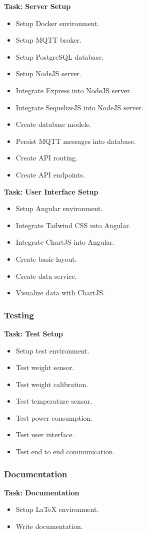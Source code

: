 \textbf{Task: Server Setup}
\begin{itemize}
    \item Setup Docker environment.
    \item Setup MQTT broker.
    \item Setup PostgreSQL database.
    \item Setup NodeJS server.
    \item Integrate Express into NodeJS server.
    \item Integrate SequelizeJS into NodeJS server.
    \item Create database models.
    \item Persist MQTT messages into database.
    \item Create API routing.
    \item Create API endpoints.
\end{itemize}

\newpage
\textbf{Task: User Interface Setup}
\begin{itemize}
    \item Setup Angular environment.
    \item Integrate Tailwind CSS into Angular.
    \item Integrate ChartJS into Angular.
    \item Create basic layout.
    \item Create data service.
    \item Visualize data with ChartJS.
\end{itemize}

\subsubsection{Testing}
\textbf{Task: Test Setup}
\begin{itemize}
    \item Setup test environment.
    \item Test weight sensor.
    \item Test weight calibration.
    \item Test temperature sensor.
    \item Test power consumption.
    \item Test user interface.
    \item Test end to end communication.
\end{itemize}

\subsubsection{Documentation}
\textbf{Task: Documentation}
\begin{itemize}
    \item Setup LaTeX environment.
    \item Write documentation.
\end{itemize}